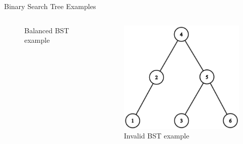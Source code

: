 \documentclass[aspectratio=169]{beamer}%
\begin{document}
\begin{frame}{Binary Search Tree Examples}
\begin{columns}
\begin{column}{0.32\textwidth}
\begin{figure}
                \caption{Balanced BST example}
            \end{figure}
        \end{column}
        \hfill
        \begin{column}{0.32\textwidth}
            \begin{figure}
                \centering
                \includegraphics[width = 0.9\linewidth]{not_bst.png}
                \caption{Invalid BST example}
            \end{figure}
        \end{column}
    \end{columns}
\end{frame}
\end{document}
